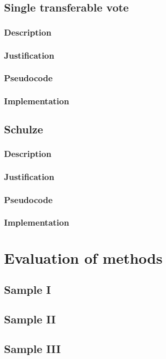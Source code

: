 \subsection{Single transferable vote}
\subsubsection{Description}
\subsubsection{Justification}
\subsubsection{Pseudocode}
\subsubsection{Implementation}
\subsection{Schulze}
\subsubsection{Description}
\subsubsection{Justification}
\subsubsection{Pseudocode}
\subsubsection{Implementation}

\section{Evaluation of methods}
\subsection{Sample I}
\subsection{Sample II}
\subsection{Sample III}


